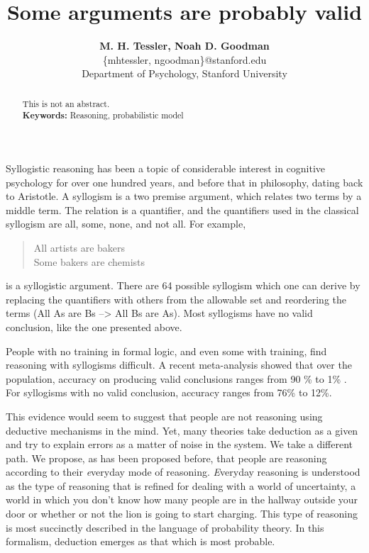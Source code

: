 \documentclass[10pt,letterpaper]{article}
\begin{document}
\title{Some arguments are probably valid}
 
\author{{\large \bf M. H. Tessler, Noah D. Goodman } \\
	\{mhtessler, ngoodman\}@stanford.edu \\
  Department of Psychology, Stanford University}

\maketitle


\begin{abstract}
This is not an abstract.\\
\textbf{Keywords:} 
Reasoning, probabilistic model
\end{abstract}

Syllogistic reasoning has been a topic of considerable interest in cognitive psychology for over one hundred years, and before that in philosophy, dating back to Aristotle. A syllogism is a two premise argument, which relates two terms by a middle term. The relation is a quantifier, and the quantifiers used in the classical syllogism are all, some, none, and not all. For example,

\begin{quotation}
All artists are bakers\\
Some bakers are chemists\\
\end{quotation}

is a syllogistic argument. There are 64 possible syllogism which one can derive by replacing the quantifiers with others from the allowable set and reordering the terms (All As are Bs --> All Bs are As). Most syllogisms have no valid conclusion, like the one presented above. 

People with no training in formal logic, and even some with training, find reasoning with syllogisms difficult. A recent meta-analysis showed that over the population, accuracy on producing valid conclusions ranges from 90 \% to 1\% \cite{khemlaniJL2012}. For syllogisms with no valid conclusion, accuracy ranges from 76\% to 12\%.

This evidence would seem to suggest that people are not reasoning using deductive mechanisms in the mind. Yet, many theories take deduction as a given and try to explain errors as a matter of noise in the system. We take a different path. We propose, as has been proposed before, that people are reasoning according to their {\emph everyday} mode of reasoning. {\emph Everyday} reasoning is understood as the type of reasoning that is refined for dealing with a world of uncertainty, a world in which you don't know how many people are in the hallway outside your door or whether or not the lion is going to start charging. This type of reasoning is most succinctly described in the language of probability theory. In this formalism, deduction emerges as that which is most probable.
\end{document}

